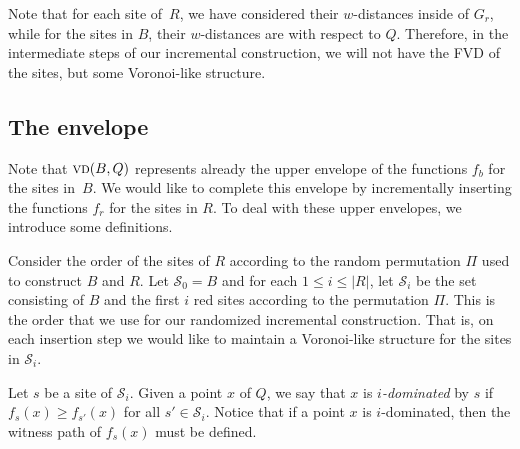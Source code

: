 \documentclass[a4paper, 11pt]{article}
\newcommand{\idom}[1][i]{${#1}$-dominated\xspace}
\newcommand{\s}{\mathcal S}
\newcommand{\vd}[2][P]{\textsc{vd}(#2, #1)}
\begin{document}

Note that for each site of~$R$, we have considered their $w$-distances inside of $G_r$, while for the sites in $B$, their $w$-distances are with respect to $Q$.
Therefore, in the intermediate steps of our incremental construction, we will not have the FVD of the sites, but some Voronoi-like structure.



\subsection{The envelope}
Note that $\vd[Q]{B}$ represents already the upper envelope of the functions $f_b$ for the sites in~$B$. 
We would like to complete this envelope by incrementally inserting the functions $f_r$ for the sites in $R$.
To deal with these upper envelopes, we introduce some definitions.




Consider the order of the sites of $R$ according to the random permutation $\Pi$ used to construct $B$ and $R$.
Let $\s_0 = B$ and for each $1\leq i\leq |R|$, let $\s_i$ be the set consisting of $B$ and the first $i$ red sites according to the permutation $\Pi$.
This is the order that we use for our randomized incremental construction. 
That is, on each insertion step we would like to maintain a Voronoi-like structure for the sites in $\s_i$.

Let $s$ be a site of $\s_i$.
Given a point $x$ of $Q$, we say that $x$ is \emph{\idom} by $s$ if $f_s(x) \geq f_{s'}(x)$ for all $s'\in \s_i$.
Notice that if a point $x$ is \idom, then the witness path of $f_s(x)$ must be defined. 
\end{document}
